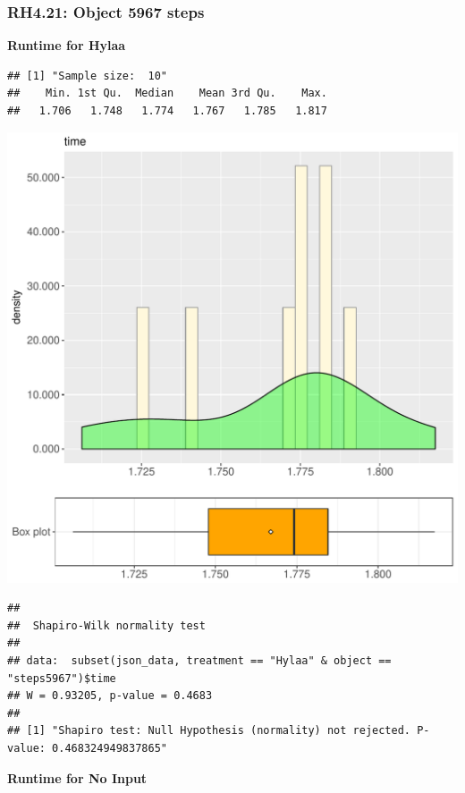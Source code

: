 \documentclass{article}\usepackage[]{graphicx}\usepackage[]{color}
\makeatletter
\def\maxwidth{ %
  \ifdim\Gin@nat@width>\linewidth
    \linewidth
  \else
    \Gin@nat@width
  \fi
}
\newenvironment{kframe}{%
 \def\at@end@of@kframe{}%
 \ifinner\ifhmode%
  \def\at@end@of@kframe{\end{minipage}}%
  \begin{minipage}{\columnwidth}%
 \fi\fi%
 \def\FrameCommand##1{\hskip\@totalleftmargin \hskip-\fboxsep
 \colorbox{shadecolor}{##1}\hskip-\fboxsep
     \hskip-\linewidth \hskip-\@totalleftmargin \hskip\columnwidth}%
 \MakeFramed {\advance\hsize-\width
   \@totalleftmargin\z@ \linewidth\hsize
   \@setminipage}}%
 {\par\unskip\endMakeFramed%
 \at@end@of@kframe}
\newenvironment{knitrout}{}{} %
\makeatother
\begin{document}
\subsubsection{RH4.21: Object 5967 steps}

 \textbf{Runtime for Hylaa}
\begin{knitrout}
\color{fgcolor}\begin{kframe}
\begin{verbatim}
## [1] "Sample size:  10"
##    Min. 1st Qu.  Median    Mean 3rd Qu.    Max. 
##   1.706   1.748   1.774   1.767   1.785   1.817
\end{verbatim}
\end{kframe}
\includegraphics[width=\maxwidth]{figure/RH4_Hylaa_steps5967-1} 
\begin{kframe}\begin{verbatim}
## 
## 	Shapiro-Wilk normality test
## 
## data:  subset(json_data, treatment == "Hylaa" & object == "steps5967")$time
## W = 0.93205, p-value = 0.4683
## 
## [1] "Shapiro test: Null Hypothesis (normality) not rejected. P-value: 0.468324949837865"
\end{verbatim}
\end{kframe}
\end{knitrout}
 \textbf{Runtime for No Input}
\end{document}
